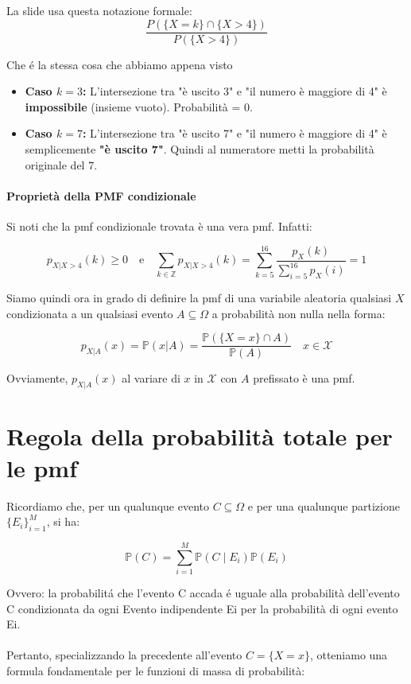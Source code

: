 La slide usa questa notazione formale:
\[
\frac{P(\{X = k\} \cap \{X > 4\})}{P(\{X > 4\})}
\]

Che é la stessa cosa che abbiamo appena visto 
\begin{itemize}
    \item \textbf{Caso $k = 3$:} L'intersezione tra "è uscito 3" e "il numero è maggiore di 4" è \textbf{impossibile} (insieme vuoto). Probabilità = $0$.
    \item \textbf{Caso $k = 7$:} L'intersezione tra "è uscito 7" e "il numero è maggiore di 4" è semplicemente \textbf{"è uscito 7"}. Quindi al numeratore metti la probabilità originale del $7$.
\end{itemize}

\paragraph{Proprietà della PMF condizionale}
Si noti che la pmf condizionale trovata è una vera pmf. Infatti:

\[
p_{X|X>4}(k) \ge 0 \quad \text{e} \quad \sum_{k \in \mathbb{Z}} p_{X|X>4}(k) = \sum_{k=5}^{16} \frac{p_X(k)}{\sum_{i=5}^{16} p_X(i)} = 1
\]

Siamo quindi ora in grado di definire la pmf di una variabile aleatoria qualsiasi $X$ condizionata a un qualsiasi evento $A \subseteq \Omega$ a probabilità non nulla nella forma:

\begin{equation}
\boxed{p_{X|A}(x) = \mathbb{P}(x|A) = \frac{\mathbb{P}(\{X = x\} \cap A)}{\mathbb{P}(A)} \quad x \in \mathcal{X}}
\end{equation}

Ovviamente, $p_{X|A}(x)$ al variare di $x$ in $\mathcal{X}$ con $A$ prefissato è una pmf.

\section{Regola della probabilità totale per le pmf}

Ricordiamo che, per un qualunque evento $C \subseteq \Omega$ e per una qualunque partizione $\{E_i\}_{i=1}^M$, si ha:

\[
\mathbb{P}(C) = \sum_{i=1}^M \mathbb{P}(C \mid E_i)\mathbb{P}(E_i)
\]

Ovvero: la probabilitá che l'evento C accada é uguale alla probabilità dell'evento C condizionata da ogni Evento indipendente Ei per la probabilità di ogni evento Ei.
\\\\
Pertanto, specializzando la precedente all'evento $C = \{X = x\}$, otteniamo una formula fondamentale per le funzioni di massa di probabilità:


